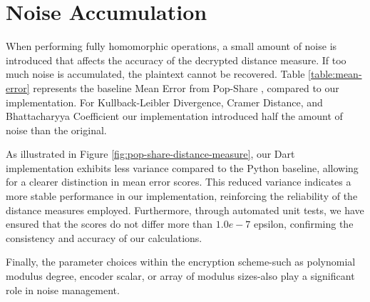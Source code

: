\section{Noise Accumulation}
\label{sec:Noise Accumulation}
When performing fully homomorphic operations, a small amount of noise is introduced that affects the accuracy of the decrypted distance measure. If too much noise is accumulated, the plaintext cannot be recovered. Table \ref{table:mean-error} represents the baseline Mean Error from Pop-Share \cite{Lagesse2021-PopShare}, compared to our implementation. For Kullback-Leibler Divergence, Cramer Distance, and Bhattacharyya Coefficient our implementation introduced half the amount of noise than the original.

As illustrated in Figure \ref{fig:pop-share-distance-measure}, our Dart implementation exhibits less variance compared to the Python baseline, allowing for a clearer distinction in mean error scores. This reduced variance indicates a more stable performance in our implementation, reinforcing the reliability of the distance measures employed. Furthermore, through automated unit tests, we have ensured that the scores do not differ more than $1.0e-7$ epsilon, confirming the consistency and accuracy of our calculations.



Finally, the parameter choices within the encryption scheme-such as polynomial modulus degree, encoder scalar, or array of modulus sizes-also play a significant role in noise management.

